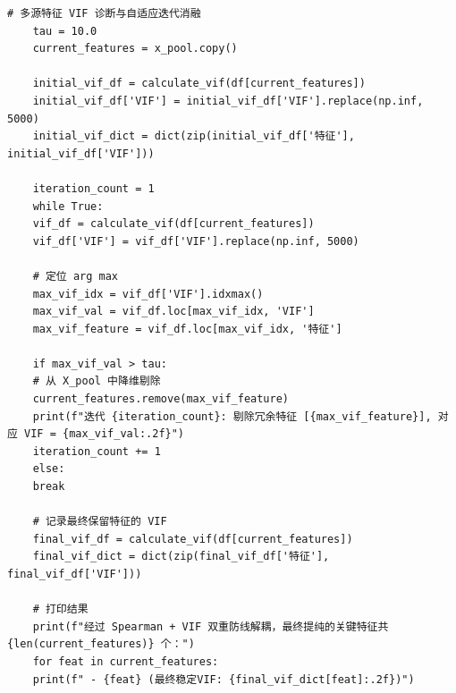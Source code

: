 \documentclass[12pt]{article}
\begin{document}
\begin{lstlisting}[caption={Spearman相关性检验+VIF多重共线性诊断特征筛选}, label={code:feature_selection_vif}]
	# 多源特征 VIF 诊断与自适应迭代消融
	tau = 10.0
	current_features = x_pool.copy()
	
	initial_vif_df = calculate_vif(df[current_features])
	initial_vif_df['VIF'] = initial_vif_df['VIF'].replace(np.inf, 5000)
	initial_vif_dict = dict(zip(initial_vif_df['特征'], initial_vif_df['VIF']))
	
	iteration_count = 1
	while True:
	vif_df = calculate_vif(df[current_features])
	vif_df['VIF'] = vif_df['VIF'].replace(np.inf, 5000)
	
	# 定位 arg max
	max_vif_idx = vif_df['VIF'].idxmax()
	max_vif_val = vif_df.loc[max_vif_idx, 'VIF']
	max_vif_feature = vif_df.loc[max_vif_idx, '特征']
	
	if max_vif_val > tau:
	# 从 X_pool 中降维剔除
	current_features.remove(max_vif_feature)
	print(f"迭代 {iteration_count}: 剔除冗余特征 [{max_vif_feature}], 对应 VIF = {max_vif_val:.2f}")
	iteration_count += 1
	else:
	break
	
	# 记录最终保留特征的 VIF
	final_vif_df = calculate_vif(df[current_features])
	final_vif_dict = dict(zip(final_vif_df['特征'], final_vif_df['VIF']))
	
	# 打印结果
	print(f"经过 Spearman + VIF 双重防线解耦，最终提纯的关键特征共 {len(current_features)} 个：")
	for feat in current_features:
	print(f" - {feat} (最终稳定VIF: {final_vif_dict[feat]:.2f})")
\end{lstlisting}
\end{document}
